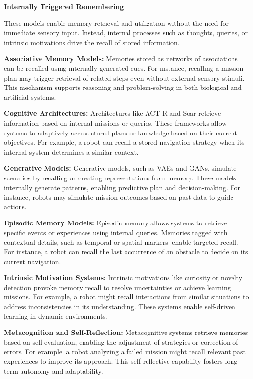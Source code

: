 \documentclass{book}
\providecommand{\ProjectDeepHeading}[2]{%
    \par\medskip\noindent\textbf{#2}\par\smallskip
}
\begin{document}
    \ProjectDeepHeading{6}{Internally Triggered Remembering}
    These models enable memory retrieval and utilization without the need for immediate sensory input. Instead, internal processes such as thoughts, queries, or intrinsic motivations drive the recall of stored information.

        \textbf{Associative Memory Models:} Memories stored as networks of associations can be recalled using internally generated cues. For instance, recalling a mission plan may trigger retrieval of related steps even without external sensory stimuli. This mechanism supports reasoning and problem-solving in both biological and artificial systems.

        \textbf{Cognitive Architectures:} Architectures like ACT-R and Soar retrieve information based on internal missions or queries. These frameworks allow systems to adaptively access stored plans or knowledge based on their current objectives. For example, a robot can recall a stored navigation strategy when its internal system determines a similar context.

        \textbf{Generative Models:} Generative models, such as VAEs and GANs, simulate scenarios by recalling or creating representations from memory. These models internally generate patterns, enabling predictive plan and decision-making. For instance, robots may simulate mission outcomes based on past data to guide actions.

        \textbf{Episodic Memory Models:} Episodic memory allows systems to retrieve specific events or experiences using internal queries. Memories tagged with contextual details, such as temporal or spatial markers, enable targeted recall. For instance, a robot can recall the last occurrence of an obstacle to decide on its current navigation. 

        \textbf{Intrinsic Motivation Systems:} Intrinsic motivations like curiosity or novelty detection provoke memory recall to resolve uncertainties or achieve learning missions. For example, a robot might recall interactions from similar situations to address inconsistencies in its understanding. These systems enable self-driven learning in dynamic environments.

        \textbf{Metacognition and Self-Reflection:} Metacognitive systems retrieve memories based on self-evaluation, enabling the adjustment of strategies or correction of errors. For example, a robot analyzing a failed mission might recall relevant past experiences to improve its approach. This self-reflective capability fosters long-term autonomy and adaptability.
\end{document}
